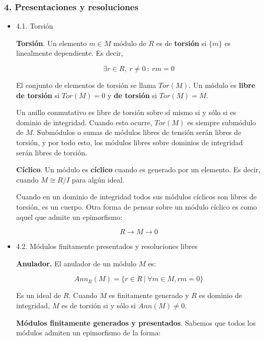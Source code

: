 \documentclass[11pt]{article}
\begin{document}
\subsubsection*{4. Presentaciones y resoluciones}
\label{sec-4-2-1}
\begin{itemize}
\item 4.1. Torsión
\label{sec-4-2-1-1}
\begin{definition}
\textbf{Torsión}. Un elemento $m \in M$ módulo de $R$ es de \textbf{torsión} si $\{m\}$ es linealmente
dependiente. Es decir,

\[ \exists r \in R,\ r \neq 0\ :\ rm = 0 \]

El conjunto de elementos de torsión se llama $Tor(M)$. Un módulo es \textbf{libre de torsión}
si $Tor(M) = 0$ y \textbf{de torsión} si $Tor(M)=M$.
\end{definition}

Un anillo conmutativo es libre de torsión sobre sí mismo si y sólo si es dominio de
integridad. Cuando esto ocurre, $Tor(M)$ es siempre submódulo de $M$. Submódulos o
sumas de módulos libres de tensión serán libres de torsión, y por todo esto, los módulos
libres sobre dominios de integridad serán libres de torsión.

\begin{definition}
\textbf{Cíclico}. Un módulo es \textbf{cíclico} cuando es generado por un elemento. Es decir,
cuando $M \cong R/I$ para algún ideal.
\end{definition}

Cuando en un dominio de integridad todos sus
módulos cíclicos son libres de torsión, es un cuerpo. Otra forma de pensar sobre un módulo
cíclico es como aquel que admite un epimorfismo:

\[ R \longrightarrow M \longrightarrow 0 \]

\item 4.2. Módulos finitamente presentados y resoluciones libres
\label{sec-4-2-1-2}
\begin{definition}
\textbf{Anulador.} El anulador de un módulo $M$ es:

\[Ann_R(M) = \{ r \in R\ |\ \forall m \in M, rm = 0 \}\]
\end{definition}

Es un ideal de $R$. Cuando $M$ es finitamente generado y $R$ es dominio de integridad,
$M$ es de torsión si y sólo si $Ann(M) \neq 0$.

\begin{definition}
\textbf{Módulos finitamente generados y presentados}. Sabemos que todos los módulos admiten un
epimorfismo de la forma:


\end{definition}
\end{itemize}
\end{document}
